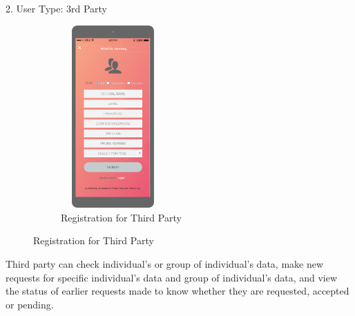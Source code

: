 2. User Type: 3rd Party

\begin{figure}[H]
	\centering
	\begin{subfigure}[b]{0.4\textwidth}	
		\includegraphics[width=4cm,height=7cm]		{./RASD_Mockups/2_T-Register.png}
      	\caption{Registration for Third Party}
        \label{TrackMe_register2}
	 \end{subfigure}
\end{figure}

Third party can check individual's or group of individual's data, make new requests for specific individual's data and group of individual's data, and view the status of earlier requests made to know whether they are requested, accepted or pending.

